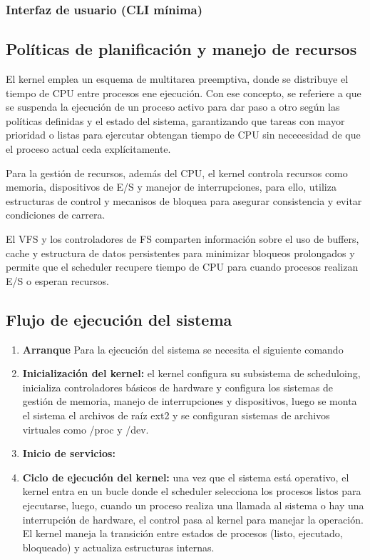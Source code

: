 \subsubsection{Interfaz de usuario (CLI mínima)}

\subsection{Políticas de planificación y manejo de recursos}
El kernel emplea un esquema de multitarea preemptiva, donde se distribuye el tiempo de CPU entre procesos ene ejecución. Con ese concepto, se referiere a que se suspenda la ejecución de un proceso activo para dar paso  a otro según las políticas definidas y el estado del sistema, garantizando que tareas con mayor prioridad o listas para ejercutar obtengan tiempo de CPU sin nececesidad de que el proceso actual ceda explícitamente. 

Para la gestión de recursos, además del CPU, el kernel controla recursos como memoria, dispositivos de E/S y manejor de interrupciones, para ello, utiliza estructuras de control y mecanisos de bloquea para asegurar consistencia y evitar condiciones de carrera.

El VFS y los controladores de FS comparten información sobre el uso de buffers, cache y estructura de datos persistentes para minimizar bloqueos prolongados y permite que el scheduler recupere tiempo de CPU para cuando procesos realizan E/S o esperan recursos.

\subsection{Flujo de ejecución del sistema}
\begin{enumerate}
    \item \textbf{Arranque} Para la ejecución del sistema se necesita el siguiente comando
    \item \textbf{Inicialización del kernel:} el kernel configura su subsistema de scheduloing, inicializa controladores básicos de hardware y configura los sistemas de gestión de memoria, manejo de interrupciones y dispositivos, luego se monta el sistema el archivos de raíz ext2 y se configuran sistemas de archivos virtuales como /proc y /dev.
    \item \textbf{Inicio de  servicios:}
    
    \item \textbf{Ciclo de ejecución del kernel:} una vez que el sistema está operativo, el kernel entra en un bucle donde el scheduler selecciona los procesos listos para ejecutarse, luego, cuando un proceso realiza una llamada al sistema o hay una interrupción de hardware, el control pasa al kernel para manejar la operación. El kernel maneja la transición entre estados de procesos (listo, ejecutado, bloqueado) y actualiza estructuras internas.
\end{enumerate}
